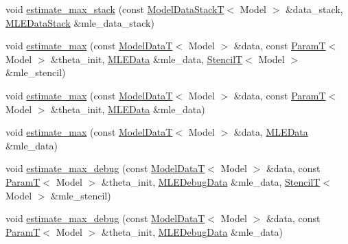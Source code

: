 \begin{DoxyCompactItemize}
\item 
void \hyperlink{classmappel_1_1estimator_1_1Estimator_aba9d96880ade861e4086b5c2cbde46b1}{estimate\+\_\+max\+\_\+stack} (const \hyperlink{namespacemappel_aaeb6665bc57476dd93c2df6ad8bc4768}{Model\+Data\+StackT}$<$ Model $>$ \&data\+\_\+stack, \hyperlink{namespacemappel_1_1estimator_structmappel_1_1estimator_1_1MLEDataStack}{M\+L\+E\+Data\+Stack} \&mle\+\_\+data\+\_\+stack)
\item 
void \hyperlink{classmappel_1_1estimator_1_1Estimator_a14b53d2ddc3d74a5653f71e4b5a97968}{estimate\+\_\+max} (const \hyperlink{namespacemappel_a97f050df953605381ae9c901c3b125f1}{Model\+DataT}$<$ Model $>$ \&data, const \hyperlink{namespacemappel_a667925cb0d6c0e49f2f035cc5a9a6857}{ParamT}$<$ Model $>$ \&theta\+\_\+init, \hyperlink{namespacemappel_1_1estimator_structmappel_1_1estimator_1_1MLEData}{M\+L\+E\+Data} \&mle\+\_\+data, \hyperlink{namespacemappel_a3a06598240007876f8c4bf834ad86197}{StencilT}$<$ Model $>$ \&mle\+\_\+stencil)
\item 
void \hyperlink{classmappel_1_1estimator_1_1Estimator_a8e1ea0bf9ef92871618c44a4cb770cb8}{estimate\+\_\+max} (const \hyperlink{namespacemappel_a97f050df953605381ae9c901c3b125f1}{Model\+DataT}$<$ Model $>$ \&data, const \hyperlink{namespacemappel_a667925cb0d6c0e49f2f035cc5a9a6857}{ParamT}$<$ Model $>$ \&theta\+\_\+init, \hyperlink{namespacemappel_1_1estimator_structmappel_1_1estimator_1_1MLEData}{M\+L\+E\+Data} \&mle\+\_\+data)
\item 
void \hyperlink{classmappel_1_1estimator_1_1Estimator_a8785a4f0e2d96fb4d30a533dc7541342}{estimate\+\_\+max} (const \hyperlink{namespacemappel_a97f050df953605381ae9c901c3b125f1}{Model\+DataT}$<$ Model $>$ \&data, \hyperlink{namespacemappel_1_1estimator_structmappel_1_1estimator_1_1MLEData}{M\+L\+E\+Data} \&mle\+\_\+data)
\item 
void \hyperlink{classmappel_1_1estimator_1_1Estimator_aca8f7fcc8d2754f55092e1dc33cff8a9}{estimate\+\_\+max\+\_\+debug} (const \hyperlink{namespacemappel_a97f050df953605381ae9c901c3b125f1}{Model\+DataT}$<$ Model $>$ \&data, const \hyperlink{namespacemappel_a667925cb0d6c0e49f2f035cc5a9a6857}{ParamT}$<$ Model $>$ \&theta\+\_\+init, \hyperlink{structmappel_1_1estimator_1_1MLEDebugData}{M\+L\+E\+Debug\+Data} \&mle\+\_\+data, \hyperlink{namespacemappel_a3a06598240007876f8c4bf834ad86197}{StencilT}$<$ Model $>$ \&mle\+\_\+stencil)
\item 
void \hyperlink{classmappel_1_1estimator_1_1Estimator_a2cb11ee4a6b01c38064b03d761840838}{estimate\+\_\+max\+\_\+debug} (const \hyperlink{namespacemappel_a97f050df953605381ae9c901c3b125f1}{Model\+DataT}$<$ Model $>$ \&data, const \hyperlink{namespacemappel_a667925cb0d6c0e49f2f035cc5a9a6857}{ParamT}$<$ Model $>$ \&theta\+\_\+init, \hyperlink{structmappel_1_1estimator_1_1MLEDebugData}{M\+L\+E\+Debug\+Data} \&mle\+\_\+data)
\end{DoxyCompactItemize}

